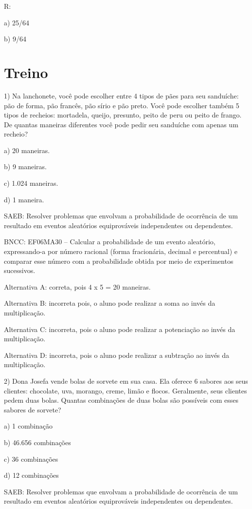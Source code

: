 R:

a) 25/64

b) 9/64

\section{Treino}

1) Na lanchonete, você pode escolher entre 4 tipos de pães para seu
sanduíche: pão de forma, pão francês, pão sírio e pão preto. Você pode
escolher também 5 tipos de recheios: mortadela, queijo, presunto, peito
de peru ou peito de frango. De quantas maneiras diferentes você pode
pedir seu sanduíche com apenas um recheio?

a) 20 maneiras.

b) 9 maneiras.

c) 1.024 maneiras.

d) 1 maneira.

SAEB: Resolver problemas que envolvam a probabilidade de ocorrência de
um resultado em eventos aleatórios equiprováveis independentes ou
dependentes.

BNCC: EF06MA30 -- Calcular a probabilidade de um evento aleatório,
expressando-a por número racional (forma fracionária, decimal e
percentual) e comparar esse número com a probabilidade obtida por meio
de experimentos sucessivos.

Alternativa A: correta, pois 4 x 5 = 20 maneiras.

Alternativa B: incorreta pois, o aluno pode realizar a soma ao invés da
multiplicação.

Alternativa C: incorreta, pois o aluno pode realizar a potenciação ao
invés da multiplicação.

Alternativa D: incorreta, pois o aluno pode realizar a subtração ao
invés da multiplicação.

2) Dona Josefa vende bolas de sorvete em sua casa. Ela oferece 6 sabores
aos seus clientes: chocolate, uva, morango, creme, limão e flocos.
Geralmente, seus clientes pedem duas bolas. Quantas combinações de duas
bolas são possíveis com esses sabores de sorvete?

a) 1 combinação

b) 46.656 combinações

c) 36 combinações

d) 12 combinações

SAEB: Resolver problemas que envolvam a probabilidade de ocorrência de
um resultado em eventos aleatórios equiprováveis independentes ou
dependentes.

